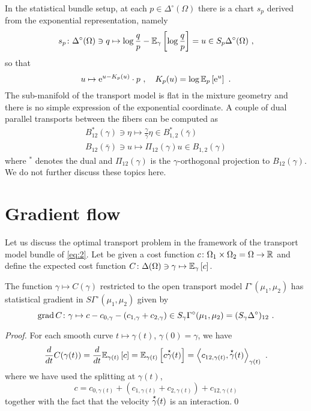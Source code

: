 \documentclass[runningheads]{llncs}
\begin{document}
In the statistical bundle setup, at each $p \in \Delta^\circ(\Omega)$ there is a chart $s_p$ derived from the exponential representation, namely
\begin{equation*}
 s_p \colon \Delta^\circ(\Omega) \ni q \mapsto \log \frac q p - {\operatorname{\mathbb E}}_{\gamma}\left[\log \frac q p\right] = u \in S_p\Delta^\circ(\Omega) \ ,
\end{equation*}
so that
\begin{equation*}
  u \mapsto \mathrm{e}^{u - K_p(u)} \cdot p \ , \quad K_p(u) = \log {\operatorname{\mathbb E}}_{p}\left[\mathrm{e}^u\right] \ .
\end{equation*}
The sub-manifold of the transport model is flat in the mixture geometry and there is no simple expression of the exponential coordinate. A couple of dual parallel transports between the fibers can be computed as
\begin{gather*}
  B^*_{12}(\gamma) \ni \eta \mapsto \frac \gamma {\bar\gamma} \eta \in B^*_{1,2}(\bar\gamma) \\
  B_{12}(\bar\gamma) \ni u \mapsto \Pi_{12}(\gamma) u \in B_{1,2}(\gamma) 
\end{gather*}
where $^*$ denotes the dual and $\Pi_{12}(\gamma)$ is the
$\gamma$-orthogonal projection to $B_{12}(\gamma)$. We do not further
discuss these topics here.


\section{Gradient flow}

  Let us discuss the optimal transport problem in the framework of the
  transport model bundle of \cref{eq:2}. Let be given a cost function
  $c \colon \Omega_1 \times \Omega_2 = \Omega \to \mathbb R$ and define the
  expected cost function
  $C \colon \Delta(\Omega)\ni \gamma \mapsto {\operatorname{\mathbb E}}_{\gamma}\left[c\right]$.

\begin{proposition}The function $\gamma \mapsto C(\gamma)$ restricted to the open transport model $\Gamma^\circ(\mu_1,\mu_2)$ has statistical gradient in $S\Gamma^\circ(\mu_1,\mu_2)$ given by
%
\begin{equation}\label{eq:gradient}
 \operatorname{grad} C \colon \gamma \mapsto c - c_{0,\gamma} - (c_{1,\gamma} + c_{2,\gamma}) \in S_\gamma\Gamma^\circ(\mu_1,\mu_2) = (S_\gamma \Delta^\circ)_{12} \ . 
\end{equation}
\end{proposition}

\begin{proof}
For each smooth curve $t \mapsto \gamma(t)$, $\gamma(0) = \gamma$, we have 
\begin{equation*}
  \derivby t C(\gamma(t)) = \derivby t \expectat {\gamma(t)} c = \expectat {\gamma(t)} {c \velocity \gamma (t)} = \scalarat {\gamma(t)} {c_{12,\gamma(t)}} {\velocity \gamma(t)} \ .
\end{equation*}
where we have used the splitting at $\gamma(t)$,
\begin{equation*}
  c = c_{0,\gamma(t)} + (c_{1,\gamma(t)} + c_{2,\gamma(t)}) + c_{12,\gamma(t)}
\end{equation*}
together with the fact that the velocity $\overset{\star}{\gamma}(t)$ is an interaction.\qed \end{proof}
\end{document}
